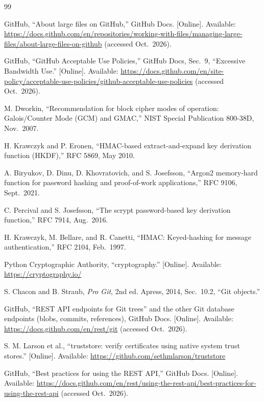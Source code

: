 \begingroup
\footnotesize
\setlength{\itemsep}{1pt}
\renewcommand{\refname}{References}
\begin{thebibliography}{99}
\setlength{\itemsep}{1.5pt}

 GitHub, ``About large files on GitHub,'' GitHub Docs. [Online]. Available:
\url{https://docs.github.com/en/repositories/working-with-files/managing-large-files/about-large-files-on-github}
(accessed Oct.\ 2026).

 GitHub, ``GitHub Acceptable Use Policies,'' GitHub Docs, Sec.~9, ``Excessive
Bandwidth Use.'' [Online]. Available:
\url{https://docs.github.com/en/site-policy/acceptable-use-policies/github-acceptable-use-policies}
(accessed Oct.\ 2026).

 M. Dworkin, ``Recommendation for block cipher modes of operation: Galois/Counter
Mode (GCM) and GMAC,'' NIST Special Publication 800-38D, Nov.\ 2007.

 H. Krawczyk and P. Eronen, ``HMAC-based extract-and-expand key derivation function
(HKDF),'' RFC 5869, May 2010.

 A. Biryukov, D. Dinu, D. Khovratovich, and S. Josefsson, ``Argon2 memory-hard
function for password hashing and proof-of-work applications,'' RFC 9106, Sept.\ 2021.

 C. Percival and S. Josefsson, ``The scrypt password-based key derivation
function,'' RFC 7914, Aug.\ 2016.

 H. Krawczyk, M. Bellare, and R. Canetti, ``HMAC: Keyed-hashing for message
authentication,'' RFC 2104, Feb.\ 1997.

 Python Cryptographic Authority, ``cryptography.'' [Online]. Available:
\url{https://cryptography.io/}

 S. Chacon and B. Straub, \emph{Pro Git}, 2nd ed. Apress, 2014, Sec.~10.2,
``Git objects.''

 GitHub, ``REST API endpoints for Git trees'' and the other Git database endpoints
(blobs, commits, references), GitHub Docs. [Online]. Available: \url{https://docs.github.com/en/rest/git}
(accessed Oct.\ 2026).

 S. M. Larson et al., ``truststore: verify certificates using native system trust
stores.'' [Online]. Available: \url{https://github.com/sethmlarson/truststore}

 GitHub, ``Best practices for using the REST API,'' GitHub Docs. [Online]. Available:
\url{https://docs.github.com/en/rest/using-the-rest-api/best-practices-for-using-the-rest-api}
(accessed Oct.\ 2026).


\end{thebibliography}
